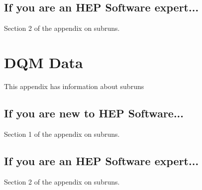 \section{If you are an HEP Software expert...}

Section 2 of the appendix on subruns.

\chapter{DQM Data}
\label{ch:DQM data}

This appendix has information about subruns

\section{If you are new to HEP Software...}

Section 1 of the appendix on subruns.


\section{If you are an HEP Software expert...}

Section 2 of the appendix on subruns.

\cleardoublepage
\printindex

